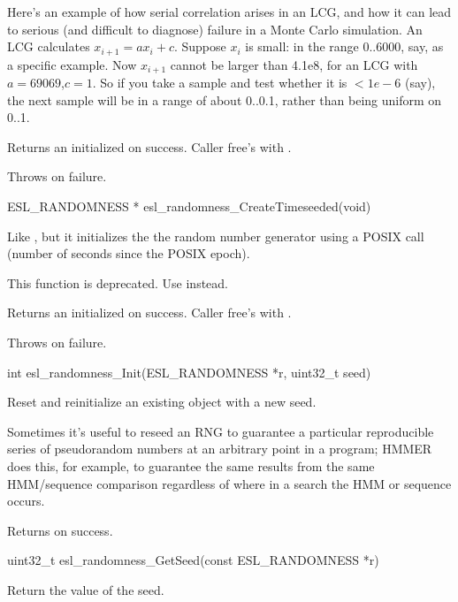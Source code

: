 \begin{sreapi}
Here's an example of how serial correlation arises in an
LCG, and how it can lead to serious (and difficult to
diagnose) failure in a Monte Carlo simulation.  An LCG
calculates $x_{i+1} = ax_i + c$. Suppose $x_i$ is small:
in the range 0..6000, say, as a specific example. Now
$x_{i+1}$ cannot be larger than 4.1e8, for an LCG with
$a=69069$,$c=1$. So if you take a sample and test
whether it is $< 1e-6$ (say), the next sample will be in
a range of about 0..0.1, rather than being uniform on
0..1.

Returns an initialized  on success.
Caller free's with .

Throws  on failure.



\hypertarget{func:esl_randomness_CreateTimeseeded()}
{\item[ESL\_RANDOMNESS * esl\_randomness\_CreateTimeseeded(void)]}

Like , but it initializes the
the random number generator using a POSIX  call 
(number of seconds since the POSIX epoch).

This function is deprecated. Use 
 instead.

Returns an initialized  on success.
Caller free's with .

Throws  on failure.



\hypertarget{func:esl_randomness_Init()}
{\item[int esl\_randomness\_Init(ESL\_RANDOMNESS *r, uint32\_t seed)]}

Reset and reinitialize an existing 
object with a new seed. 

Sometimes it's useful to reseed an RNG to guarantee a
particular reproducible series of pseudorandom numbers
at an arbitrary point in a program; HMMER does this, for
example, to guarantee the same results from the same
HMM/sequence comparison regardless of where in a search
the HMM or sequence occurs.

Returns  on success.



\hypertarget{func:esl_randomness_GetSeed()}
{\item[uint32\_t esl\_randomness\_GetSeed(const ESL\_RANDOMNESS *r)]}

Return the value of the seed. 



\end{sreapi}
